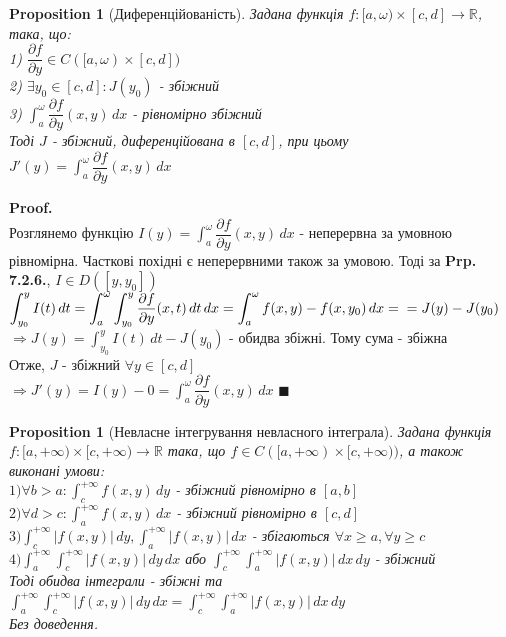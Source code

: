 \documentclass[a4paper, 14pt]{extarticle}
\def\huge{\displaystyle}
\def\bigline{\vspace{5mm}\\}
\theoremstyle{theoremdd}
\theoremstyle{theoremdd}
\theoremstyle{theoremdd}
\theoremstyle{theoremdd}
\theoremstyle{theoremdd}
\newtheorem{proposition}[theorem]{Proposition}
\theoremstyle{theoremdd}
\theoremstyle{theoremdd}
\theoremstyle{theoremdd}
\newenvironment{pf}{\vspace*{-3mm} \textbf{Proof. \\}}{$\blacksquare$}
\def\departial#1#2{\dfrac{\partial {#1}}{\partial {#2}}}
\begin{document}
\begin{proposition}[Диференційованість]
Задана функція $f: [a,\omega) \times [c,d] \to \mathbb{R}$, така, що:\\
1) $\departial{f}{y} \in C([a,\omega) \times [c,d])$\\
2) $\exists y_0 \in [c,d]: J(y_0)$ - збіжний\\
3) $\huge \int_a^\omega \departial{f}{y}(x,y)\,dx$ - рівномірно збіжний\\
Тоді $J$ - збіжний, диференційована в $[c,d]$, при цьому $J'(y) = \huge \int_a^\omega \departial{f}{y}(x,y)\,dx$
\end{proposition}

\begin{pf}
Розглянемо функцію $I(y) = \huge \int_a^\omega \departial{f}{y}(x,y)\,dx$ - неперервна за умовною рівномірна. Часткові похідні є неперервними також за умовою. Тоді за \textbf{Prp. 7.2.6.}, $I \in D([y,y_0])$\\
$\huge \int_{y_0}^y I(t)\,dt = \huge \int_a^\omega \int_{y_0}^y \departial{f}{y}(x,t)\,dt\,dx = \int_a^\omega f(x,y)-f(x,y_0)\,dx = \\ = J(y) - J(y_0)$\\
$\Rightarrow J(y) = \huge \int_{y_0}^y I(t)\,dt - J(y_0)$ - обидва збіжні. Тому сума - збіжна\\
Отже, $J$ - збіжний $\forall y \in [c,d]$\\
$\Rightarrow J'(y) = I(y) - 0 = \huge \int_a^\omega \departial{f}{y}(x,y)\,dx$
\end{pf}
\bigline

\begin{proposition}[Невласне інтегрування невласного інтеграла]
Задана функція $f: [a, +\infty) \times [c, +\infty) \to \mathbb{R}$ така, що $f \in C([a, +\infty) \times [c, +\infty))$, а також виконані умови:\\
$1) \forall b > a: \huge \int_c^{+\infty} f(x,y)\,dy$ - збіжний рівномірно в $[a,b]$\\
$2) \forall d > c: \huge \int_a^{+\infty} f(x,y)\,dx$ - збіжний рівномірно в $[c,d]$\\
$3) \huge \int_c^{+\infty} |f(x,y)|\,dy, \huge \int_a^{+\infty} |f(x,y)|\,dx$ - збігаються $\forall x \geq a, \forall y \geq c$\\
$4) \huge \int_a^{+\infty} \int_c^{+\infty} |f(x,y)|\,dy\,dx$ або $\huge \int_c^{+\infty} \int_a^{+\infty} |f(x,y)|\,dx\,dy$ - збіжний\\
Тоді обидва інтеграли - збіжні та \\ $\huge \int_a^{+\infty} \int_c^{+\infty} |f(x,y)|\,dy\,dx  = \huge \int_c^{+\infty} \int_a^{+\infty} |f(x,y)|\,dx\,dy$\\
\textit{Без доведення.}
\end{proposition}
\end{document}
